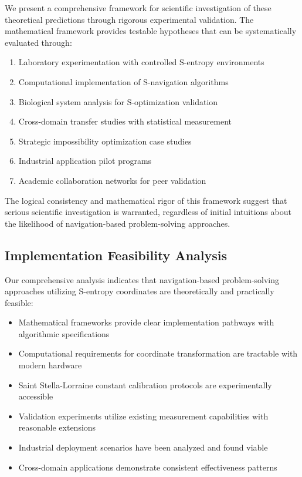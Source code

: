 \documentclass[11pt]{article}
\theoremstyle{definition}
\theoremstyle{remark}
\begin{document}
{We present a comprehensive framework for scientific investigation of these theoretical predictions through rigorous experimental validation. The mathematical framework provides testable hypotheses that can be systematically evaluated through:

\begin{enumerate}
\item Laboratory experimentation with controlled S-entropy environments
\item Computational implementation of S-navigation algorithms
\item Biological system analysis for S-optimization validation
\item Cross-domain transfer studies with statistical measurement
\item Strategic impossibility optimization case studies
\item Industrial application pilot programs
\item Academic collaboration networks for peer validation
\end{enumerate}

The logical consistency and mathematical rigor of this framework suggest that serious scientific investigation is warranted, regardless of initial intuitions about the likelihood of navigation-based problem-solving approaches.

\subsection{Implementation Feasibility Analysis}

Our comprehensive analysis indicates that navigation-based problem-solving approaches utilizing S-entropy coordinates are theoretically and practically feasible:

\begin{itemize}
\item Mathematical frameworks provide clear implementation pathways with algorithmic specifications
\item Computational requirements for coordinate transformation are tractable with modern hardware
\item Saint Stella-Lorraine constant calibration protocols are experimentally accessible
\item Validation experiments utilize existing measurement capabilities with reasonable extensions
\item Industrial deployment scenarios have been analyzed and found viable
\item Cross-domain applications demonstrate consistent effectiveness patterns
\end{itemize}

}
\end{document}
